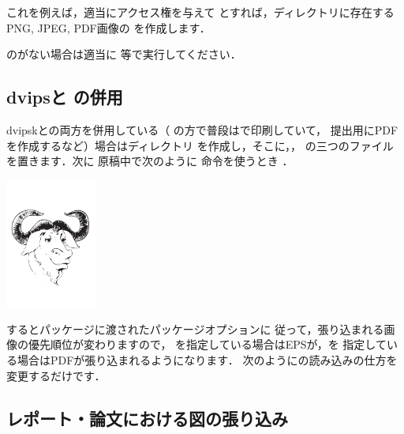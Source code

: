 これを例えば，適当にアクセス権を与えて 
とすれば，ディレクトリに存在するPNG, JPEG, PDF画像の
\BB を作成します．

のがない場合は適当に 
等で実行してください．


\subsection{dvipsと\texorpdfstring{\Dvipdfmx}{Dvipdfmx} の併用}

dvipskと\Dvipdfmx の両方を併用している（
の方で普段は\PS で印刷していて，
提出用にPDFを作成するなど）場合はディレクトリ
を作成し，そこに，，
の三つのファイルを置きます．次に
原稿中で次のように  命令を使うとき
．

\begin{InText}
\includegraphics[width=3cm]{images/gnu-head}
\end{InText}

するとパッケージに渡されたパッケージオプションに
従って，張り込まれる画像の優先順位が変わりますので，
を指定している場合はEPSが，を
指定している場合はPDFが張り込まれるようになります．
次のようにの読み込みの仕方を変更するだけです．

\begin{InText}
\usepackage[dvipdfmx]{graphicx} %
\end{InText}


\subsection{レポート・論文における図の張り込み}

